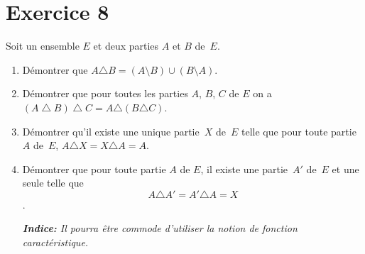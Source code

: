 \documentclass{report}
\begin{document}
\section{Exercice 8}

\qs{}
{
Soit un ensemble $E$ et deux parties $A$ et $B$ de~$E$. 
\begin{enumerate}
\item Démontrer que $A \triangle B = (A \setminus B) \cup(B \setminus A)$.
\item Démontrer que pour toutes les parties $A$, $B$, $C$ de $E$ on a
$(A \bigtriangleup B) \bigtriangleup C = A \triangle(B \triangle C)$.
\item Démontrer qu'il existe une unique partie~$X$ de~$E$ telle que 
pour toute partie~$A$ de~$E$, $A \triangle X = X \triangle A = A$.
\item Démontrer que pour toute partie $A$ de $E$, il existe une partie~$A'$
de~$E$ et une seule telle que $$A \triangle A' = A' \triangle A = X$$.

\textit{ \textbf{Indice:}  \scriptsize Il pourra être commode 
d'utiliser la notion de fonction caractéristique.}
\end{enumerate}
}
\end{document}
